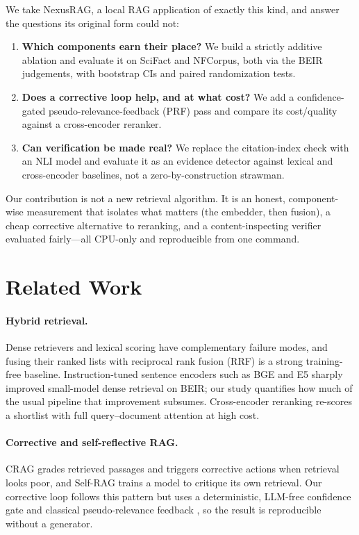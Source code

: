 \documentclass[11pt]{article}
\begin{document}
We take NexusRAG, a local RAG application of exactly this kind, and answer the
questions its original form could not:

\begin{enumerate}
\item \textbf{Which components earn their place?} We build a strictly additive
ablation and evaluate it on SciFact \citep{wadden2020scifact} and NFCorpus, both
via the BEIR \citep{thakur2021beir} judgements, with bootstrap CIs and paired
randomization tests.
\item \textbf{Does a corrective loop help, and at what cost?} We add a
confidence-gated pseudo-relevance-feedback (PRF) pass and compare its
cost/quality against a cross-encoder reranker.
\item \textbf{Can verification be made real?} We replace the citation-index
check with an NLI model and evaluate it as an evidence detector against lexical
and cross-encoder baselines, not a zero-by-construction strawman.
\end{enumerate}

Our contribution is not a new retrieval algorithm. It is an honest,
component-wise measurement that isolates what matters (the embedder, then
fusion), a cheap corrective alternative to reranking, and a content-inspecting
verifier evaluated fairly---all CPU-only and reproducible from one command.

\section{Related Work}

\paragraph{Hybrid retrieval.} Dense retrievers \citep{karpukhin2020dpr,
reimers2019sbert} and lexical scoring \citep{robertson2009bm25} have
complementary failure modes, and fusing their ranked lists with reciprocal rank
fusion (RRF) \citep{cormack2009rrf} is a strong training-free baseline.
Instruction-tuned sentence encoders such as BGE \citep{xiao2024cpack} and E5
\citep{wang2022e5} sharply improved small-model dense retrieval on BEIR; our
study quantifies how much of the usual pipeline that improvement subsumes.
Cross-encoder reranking \citep{nogueira2019passage} re-scores a shortlist with
full query--document attention at high cost.

\paragraph{Corrective and self-reflective RAG.} CRAG \citep{yan2024crag} grades
retrieved passages and triggers corrective actions when retrieval looks poor, and
Self-RAG \citep{asai2024selfrag} trains a model to critique its own retrieval.
Our corrective loop follows this pattern but uses a deterministic, LLM-free
confidence gate and classical pseudo-relevance feedback \citep{lavrenko2001rm},
so the result is reproducible without a generator.
\end{document}
